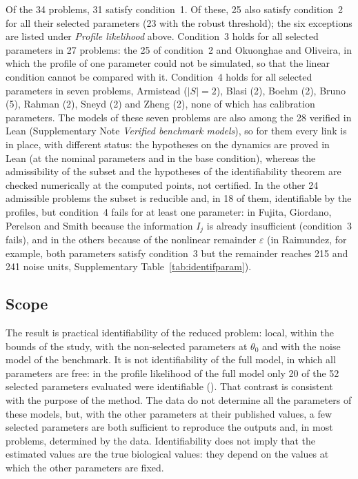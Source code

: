 Of the 34 problems, 31 satisfy condition~1. Of these, 25 also satisfy condition~2 for all their selected parameters (23 with the robust threshold); the six exceptions are listed under \emph{Profile likelihood} above. Condition~3 holds for all selected parameters in 27 problems: the 25 of condition~2 and Okuonghae and Oliveira, in which the profile of one parameter could not be simulated, so that the linear condition cannot be compared with it. Condition~4 holds for all selected parameters in seven problems, Armistead ($|S|=2$), Blasi (2), Boehm (2), Bruno (5), Rahman (2), Sneyd (2) and Zheng (2), none of which has calibration parameters. The models of these seven problems are also among the 28 verified in Lean (Supplementary Note \textit{Verified benchmark models}), so for them every link is in place, with different status: the hypotheses on the dynamics are proved in Lean (at the nominal parameters and in the base condition), whereas the admissibility of the subset and the hypotheses of the identifiability theorem are checked numerically at the computed points, not certified. In the other 24 admissible problems the subset is reducible and, in 18 of them, identifiable by the profiles, but condition~4 fails for at least one parameter: in Fujita, Giordano, Perelson and Smith because the information $I_j$ is already insufficient (condition~3 fails), and in the others because of the nonlinear remainder $\varepsilon$ (in Raimundez, for example, both parameters satisfy condition~3 but the remainder reaches 215 and 241 noise units, Supplementary Table~\ref{tab:identifparam}).

\subsection*{Scope}
The result is practical identifiability of the reduced problem: local, within the bounds of the study, with the non-selected parameters at $\theta_0$ and with the noise model of the benchmark. It is not identifiability of the full model, in which all parameters are free: in the profile likelihood of the full model only 20 of the 52 selected parameters evaluated were identifiable (). That contrast is consistent with the purpose of the method. The data do not determine all the parameters of these models, but, with the other parameters at their published values, a few selected parameters are both sufficient to reproduce the outputs and, in most problems, determined by the data. Identifiability does not imply that the estimated values are the true biological values: they depend on the values at which the other parameters are fixed.

